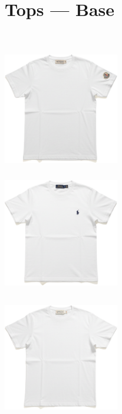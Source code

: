 \documentclass[10pt]{article}
\begin{document}
\section*{Tops — Base}\
\vspace*{2mm}\noindent
\begin{minipage}[c][50.60mm][c]{50.60mm}\centering
\includegraphics[width=50.60mm,height=50.60mm,keepaspectratio]{assets/tees/white-moncler-tee.png}\
\end{minipage} \hspace*{6.00mm} \begin{minipage}[c][50.60mm][c]{50.60mm}\centering
\includegraphics[width=50.60mm,height=50.60mm,keepaspectratio]{assets/tees/white-polo-tee.png}\
\end{minipage} \hspace*{6.00mm} \begin{minipage}[c][50.60mm][c]{50.60mm}\centering
\includegraphics[width=50.60mm,height=50.60mm,keepaspectratio]{assets/tees/white-wide-tee.png}\
\end{minipage} \hspace*{6.00mm} \begin{minipage}[c][50.60mm][c]{50.60mm}\centering

\end{minipage}
\end{document}
